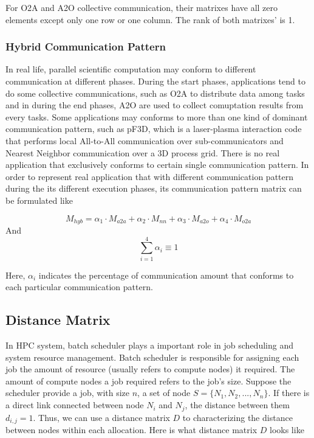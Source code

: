 \documentclass[conference]{IEEEtran}
\begin{document}
For O2A and A2O collective communication, their matrixes have all zero elements except only one row or one column. The rank of both matrixes' is 1.\\


\subsubsection{Hybrid Communication Pattern}

In real life, parallel scientific computation may conform to different communication at different phases. During the start phases, applications tend to do some collective communications, such as O2A to distribute data among tasks and in during the end phases, A2O are used to collect comuptation results from every tasks. Some applications may conforms to more than one kind of dominant communication pattern, such as pF3D, which is a laser-plasma interaction code that performs local All-to-All communication over sub-communicators and Nearest Neighbor communication over a 3D process grid\cite{langer}. There is no real application that exclusively conforms to certain single communication pattern. In order to represent real application that with different communication pattern during the its different execution phases, its communication pattern matrix can be formulated like 

\begin{equation}
  M_{hyb} = \alpha_{1}\cdot M_{a2a}+\alpha_{2}\cdot M_{nn}+\alpha_{3}\cdot M_{a2o}+\alpha_{4}\cdot M_{o2a}
\end{equation}
And 
\begin{equation}
  \sum_{i=1}^{4}\alpha_{i} \equiv 1
\end{equation}

Here, $\alpha_{i}$ indicates the percentage of communication amount that conforms to each particular communication pattern.




\subsection{Distance Matrix}
\label{sec:desitance matrix}

In HPC system, batch scheduler plays a important role in job scheduling and system resource management. Batch scheduler is responsible for assigning each job the amount of resource (usually refers to compute nodes) it required. The amount of compute nodes a job required refers to the job's size. Suppose the scheduler provide a job, with size $n$, a set of node $S = \{N_{1}, N_{2},...,N_{n}\}$. If there is a direct link connected between node $N_{i}$ and $N_{j}$, the distance between them $d_{i,j} = 1$. Thus, we can use a distance matrix $D$ to characterizing the distance between nodes within each allocation. Here is what distance matrix $D$ looks like
\end{document}
